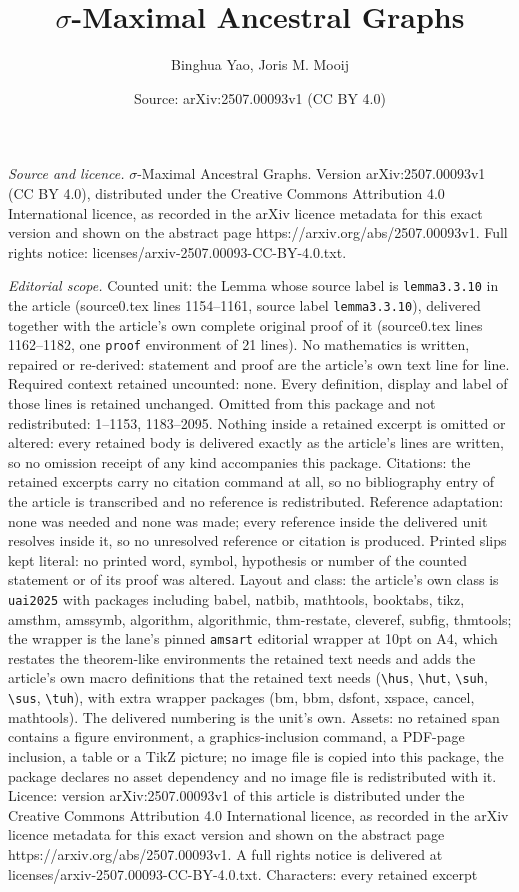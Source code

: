 \documentclass[10pt,a4paper]{amsart}
\title[$\sigma$-Maximal Ancestral Graphs]{$\sigma$-Maximal Ancestral Graphs}
\author{Binghua Yao, Joris M. Mooij}
\date{Source: arXiv:2507.00093v1 (CC BY 4.0)}
\begin{document}
\maketitle

\noindent\emph{Source and licence.} $\sigma$-Maximal Ancestral Graphs. Version arXiv:2507.00093v1 (CC BY 4.0), distributed under the Creative Commons Attribution 4.0 International licence, as recorded in the arXiv licence metadata for this exact version and shown on the abstract page https://arxiv.org/abs/2507.00093v1. Full rights notice: licenses/arxiv-2507.00093-CC-BY-4.0.txt.\par\smallskip

\noindent\textit{Editorial scope.} Counted unit: the Lemma whose source label is \texttt{lemma3.3.10} in the article (source0.tex lines 1154--1161, source label \texttt{lemma3.3.10}), delivered together with the article's own complete original proof of it (source0.tex lines 1162--1182, one \texttt{proof} environment of 21 lines). No mathematics is written, repaired or re-derived: statement and proof are the article's own text line for line. Required context retained uncounted: none. Every definition, display and label of those lines is retained unchanged. Omitted from this package and not redistributed: 1--1153, 1183--2095. Nothing inside a retained excerpt is omitted or altered: every retained body is delivered exactly as the article's lines are written, so no omission receipt of any kind accompanies this package. Citations: the retained excerpts carry no citation command at all, so no bibliography entry of the article is transcribed and no reference is redistributed. Reference adaptation: none was needed and none was made; every reference inside the delivered unit resolves inside it, so no unresolved reference or citation is produced. Printed slips kept literal: no printed word, symbol, hypothesis or number of the counted statement or of its proof was altered. Layout and class: the article's own class is \texttt{uai2025} with packages including babel, natbib, mathtools, booktabs, tikz, amsthm, amssymb, algorithm, algorithmic, thm-restate, cleveref, subfig, thmtools; the wrapper is the lane's pinned \texttt{amsart} editorial wrapper at 10pt on A4, which restates the theorem-like environments the retained text needs and adds the article's own macro definitions that the retained text needs (\texttt{\textbackslash hus}, \texttt{\textbackslash hut}, \texttt{\textbackslash suh}, \texttt{\textbackslash sus}, \texttt{\textbackslash tuh}), with extra wrapper packages (bm, bbm, dsfont, xspace, cancel, mathtools). The delivered numbering is the unit's own. Assets: no retained span contains a figure environment, a graphics-inclusion command, a PDF-page inclusion, a table or a TikZ picture; no image file is copied into this package, the package declares no asset dependency and no image file is redistributed with it. Licence: version arXiv:2507.00093v1 of this article is distributed under the Creative Commons Attribution 4.0 International licence, as recorded in the arXiv licence metadata for this exact version and shown on the abstract page https://arxiv.org/abs/2507.00093v1. A full rights notice is delivered at licenses/arxiv-2507.00093-CC-BY-4.0.txt. Characters: every retained excerpt 
\end{document}
